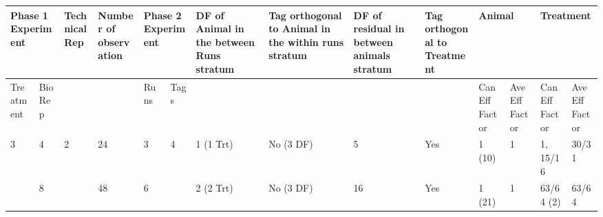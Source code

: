 \noindent 

\begin{tabular}{|p{0.5in}|p{0.3in}|p{0.5in}|p{0.7in}|p{0.3in}|p{0.3in}|p{0.7in}|p{0.7in}|p{0.6in}|p{0.6in}|p{0.4in}|p{0.4in}|p{0.5in}|p{0.4in}|} \hline 
\multicolumn{2}{|p{1in}|}{Phase 1 Experiment} & Technical Rep & Number of observation  & \multicolumn{2}{|p{0.7in}|}{Phase 2 Experiment} & DF of Animal in the between Runs stratum  & Tag orthogonal to Animal in the within runs stratum & DF of residual in between animals stratum & Tag orthogonal to Treatment & \multicolumn{2}{|p{0.8in}|}{Animal} & \multicolumn{2}{|p{0.9in}|}{Treatment} \\ \hline 
Treatment & Bio Rep &  &  & Runs & Tags  &  &  &  &  & Can Eff Factor & Ave Eff Factor & Can Eff Factor & Ave Eff Factor \\ \hline 
3 & 4 & 2 & 24 & 3 & 4 & 1 (1 Trt) & No (3 DF) & 5 & Yes & 1 (10) & 1 & 1, 15/16 & 30/31 \\ \hline 
 & 8 &  & 48 & 6 &  & 2 (2 Trt) & No (3 DF) & 16 & Yes & 1 (21) & 1 & 63/64 (2) & 63/64 \\ \hline 
\end{tabular}



\noindent 

\noindent 

\noindent 

\noindent 

